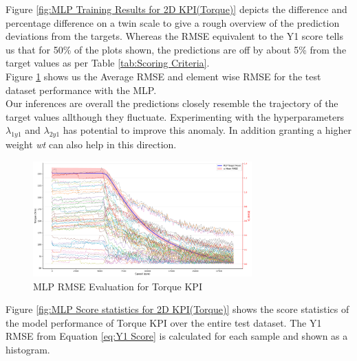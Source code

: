 \documentclass{report} %
\begin{document}
Figure \ref{fig:MLP Training Results for 2D KPI(Torque)} depicts the difference and percentage difference on a twin scale to give a rough overview of the prediction deviations from the targets.
Whereas the \ac{RMSE} equivalent to the Y1 score tells us that for 50\% of the plots shown, the predictions are off by about 5\% from the target values as per Table \ref{tab:Scoring Criteria}.\\
Figure \ref{fig:MLP RMSE Evaluation for 2D KPI(Torque)} shows us the Average \ac{RMSE} and element wise \ac{RMSE} for the test dataset performance with the \ac{MLP}. \\
Our inferences are overall the predictions closely resemble the trajectory of the target values allthough they fluctuate.
Experimenting with the hyperparameters \textit{$\lambda_{1y1}$} and \textit{$\lambda_{2y1}$} has potential to improve this anomaly. 
In addition granting a higher weight \textit{wt} can also help in this direction.\\
\begin{figure}[H]
    \centering
    \includegraphics[width=0.75\textwidth]{./ReportImages/RMSE_MLP_y1.png} 
    \caption{\ac{MLP} \ac{RMSE} Evaluation for Torque \ac{KPI}} 
    \label{fig:MLP RMSE Evaluation for 2D KPI(Torque)}
\end{figure}


Figure \ref{fig:MLP Score statistics for 2D KPI(Torque)} shows the score statistics of the model performance of Torque \ac{KPI} over the entire test dataset.
The Y1 \ac{RMSE} from Equation \ref{eq:Y1 Score} is calculated for each sample and shown as a histogram.\\
\end{document}
